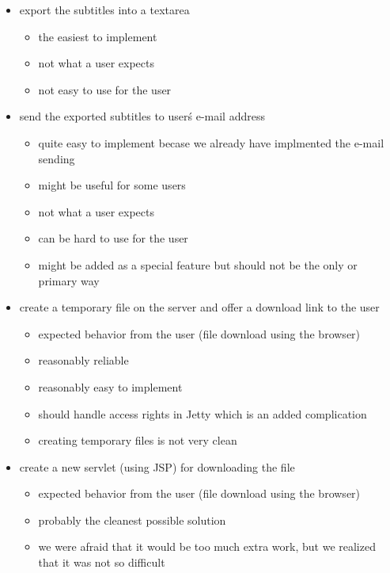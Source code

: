 \begin{itemize}

\item export the subtitles into a textarea
\begin{itemize}
\item the easiest to implement
\item not what a user expects
\item not easy to use for the user
\end{itemize}

\item send the exported subtitles to user\'s e-mail address
\begin{itemize}
\item quite easy to implement becase we already have implmented the e-mail sending
\item might be useful for some users
\item not what a user expects
\item can be hard to use for the user
\item might be added as a special feature but should not be the only or primary way
\end{itemize}

\item create a temporary file on the server and offer a download link to the user
\begin{itemize}
\item expected behavior from the user (file download using the browser)
\item reasonably reliable
\item reasonably easy to implement
\item should handle access rights in Jetty which is an added complication
\item creating temporary files is not very clean
\end{itemize}

\item create a new servlet (using JSP) for downloading the file
\begin{itemize}
\item expected behavior from the user (file download using the browser)
\item probably the cleanest possible solution
\item we were afraid that it would be too much extra work, but we realized that it was not so difficult
\end{itemize}

\end{itemize}

